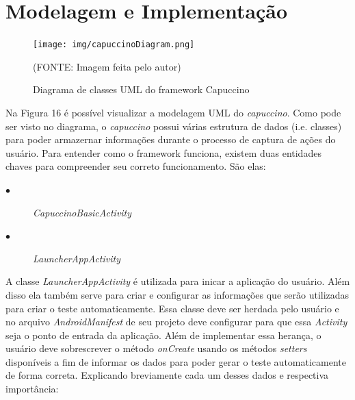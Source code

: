 \documentclass[
    12pt,       %
    openright,      %
    twoside,      %
    a4paper,      %
    english,      %
    french,       %
    spanish,      %
    brazil,       %
    ]{abntex2}
\begin{document}
      \section{Modelagem e Implementação}
        \begin{figure}[htbp]
            \begin{center}
                \texttt{[image: img/capuccinoDiagram.png]}
            \end{center}
            \caption{\label{fig:passaro} Diagrama de classes UML do framework Capuccino}
            \begin{center}(FONTE: Imagem feita pelo autor)\end{center}
        \end{figure}

        Na Figura 16 é possível visualizar a modelagem UML do \textit{capuccino}. Como pode ser
        visto no diagrama, o \textit{capuccino} possui várias estrutura de dados (i.e. classes)
        para poder armazernar informações durante o processo de captura de ações do usuário.
        Para entender como o framework funciona, existem duas entidades chaves para compreender
        seu correto funcionamento. São elas:

        \begin{description}
          \item[$\bullet$] \textit{CapuccinoBasicActivity}
          \item[$\bullet$] \textit{LauncherAppActivity}
        \end{description}

        A classe \textit{LauncherAppActivity} é utilizada para inicar a aplicação do usuário. Além
        disso ela também serve para criar e configurar as informações que serão utilizadas para criar
        o teste automaticamente. Essa classe deve ser herdada pelo usuário e no arquivo \textit{AndroidManifest}
        de seu projeto deve configurar para que essa \textit{Activity} seja o ponto
        de entrada da aplicação. Além de implementar essa herança, o usuário deve sobrescrever o
        método \textit{onCreate} usando os métodos \textit{setters} disponíveis a fim de informar os dados
        para poder gerar o teste automaticamente de forma correta. Explicando breviamente cada um
        desses dados e respectiva importância:
\end{document}
